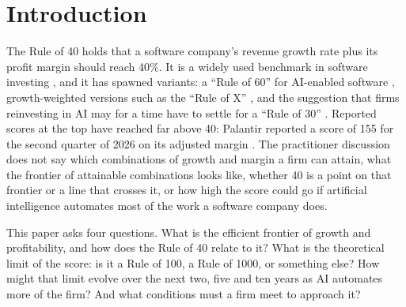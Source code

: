 \section{Introduction}\label{sec:intro}

The Rule of 40 holds that a software company's revenue growth rate plus its profit margin should reach 40\%. It is a widely used benchmark in software investing \citep{feld2015rule,depeyrot2018hacking}, and it has spawned variants: a ``Rule of 60'' for AI-enabled software \citep{vista2026rethinking}, growth-weighted versions such as the ``Rule of X'' \citep{bessemer2024rulex}, and the suggestion that firms reinvesting in AI may for a time have to settle for a ``Rule of 30'' \citep{lipman2026ai}. Reported scores at the top have reached far above 40: Palantir reported a score of 155 for the second quarter of 2026 on its adjusted margin \citep{palantir2026q2}. The practitioner discussion does not say which combinations of growth and margin a firm can attain, what the frontier of attainable combinations looks like, whether 40 is a point on that frontier or a line that crosses it, or how high the score could go if artificial intelligence automates most of the work a software company does.

This paper asks four questions. What is the efficient frontier of growth and profitability, and how does the Rule of 40 relate to it? What is the theoretical limit of the score: is it a Rule of 100, a Rule of 1000, or something else? How might that limit evolve over the next two, five and ten years as AI automates more of the firm? And what conditions must a firm meet to approach it?

